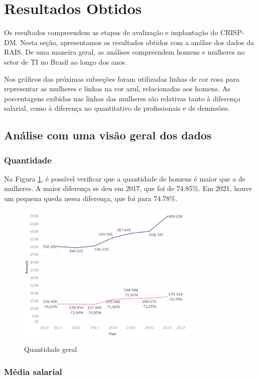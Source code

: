 \section{Resultados Obtidos}

Os resultados compreendem as etapas de avalização e implantação do CRISP-DM. Nesta seção, apresentamos os resultados obtidos com a análise dos dados da RAIS. De uma maneira geral, as análises compreendem homens e mulheres no setor de TI no Brasil ao longo dos anos. 

Nos gráficos das próximas subseções foram utilizadas linhas de cor rosa para representar as mulheres e linhas na cor azul, relacionadas aos homens. As porcentagens exibidas nas linhas das mulheres são relativas tanto à diferença salarial, como à diferença no quantitativo de profissionais e de demissões. 

\subsection{Análise com uma visão geral dos dados} \label{sub:geral}

\subsubsection{Quantidade}

Na Figura \ref{fig_1_qnt}, é possível verificar que a quantidade de homens é maior que a de mulheres. A maior diferença se deu em 2017, que foi de 74.85\%. Em 2021, houve um pequena queda nessa diferença, que foi para 74.78\%.

\begin{figure}[htbp]
	{
		\includegraphics[width=85mm]{assets/1_qnt.PNG}
	}
	\caption{Quantidade geral}
	\label{fig_1_qnt}
\end{figure}

\subsubsection{Média salarial}

